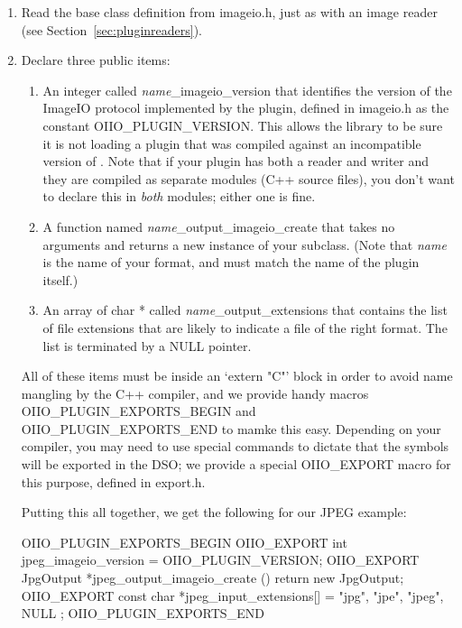 \begin{enumerate}
\item Read the base class definition from {\fn imageio.h}, just as
  with an image reader (see Section~\ref{sec:pluginreaders}).

\item Declare three public items:

  \begin{enumerate}
    \item An integer called \emph{name}{\cf _imageio_version} that identifies
      the version of the ImageIO protocol implemented by the plugin,
      defined in {\fn imageio.h} as the constant {\cf OIIO_PLUGIN_VERSION}.
      This allows the library to be sure it is not loading a plugin
      that was compiled against an incompatible version of \product.
      Note that if your plugin has both a reader and writer and they
      are compiled as separate modules (C++ source files), you don't
      want to declare this in \emph{both} modules; either one is fine.
    \item A function named \emph{name}{\cf _output_imageio_create} that
      takes no arguments and returns a new instance of your \ImageOutput
      subclass.  (Note that \emph{name} is the name of your format,
      and must match the name of the plugin itself.)
    \item An array of {\cf char *} called \emph{name}{\cf _output_extensions}
      that contains the list of file extensions that are likely to indicate
      a file of the right format.  The list is terminated by a {\cf NULL}
      pointer.
  \end{enumerate}

  All of these items must be inside an `{\cf extern "C"}' block in order
  to avoid name mangling by the C++ compiler, and we provide handy
  macros {\cf OIIO_PLUGIN_EXPORTS_BEGIN} and {\cf OIIO_PLUGIN_EXPORTS_END}
  to mamke this easy.  Depending on your
  compiler, you may need to use special commands to dictate that the
  symbols will be exported in the DSO; we provide a special {\cf
  OIIO_EXPORT} macro for this purpose, defined in {\fn export.h}.

  Putting this all together, we get the following for our JPEG example:

  \begin{code}
    OIIO_PLUGIN_EXPORTS_BEGIN
        OIIO_EXPORT int jpeg_imageio_version = OIIO_PLUGIN_VERSION;
        OIIO_EXPORT JpgOutput *jpeg_output_imageio_create () {
            return new JpgOutput;
        }
        OIIO_EXPORT const char *jpeg_input_extensions[] = {
            "jpg", "jpe", "jpeg", NULL
        };
    OIIO_PLUGIN_EXPORTS_END
  \end{code}


\end{enumerate}
